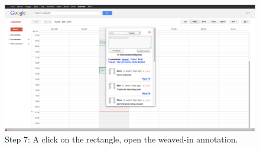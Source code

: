 \begin{figure}\centering
		\includegraphics[width=13cm]{images/gcal-screenshot-walkthrough/gcal-wt-7.png}
		\caption{Step 7: A click on the rectangle, open the weaved-in annotation.}
		\label{gcal-wt-7}
\end{figure} 